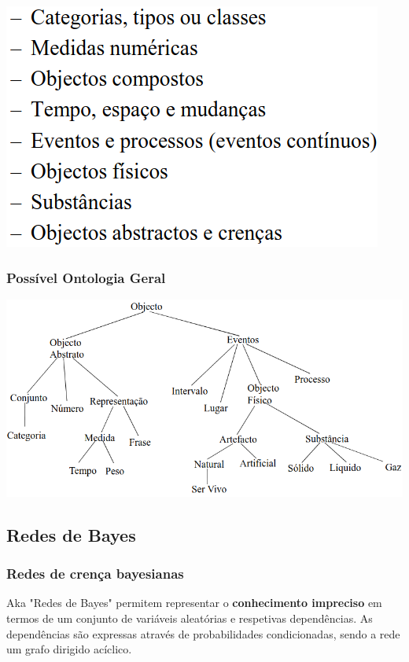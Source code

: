 \documentclass{article}
\begin{document}
\begin{center}
  \includegraphics[scale=0.35]{45}
\end{center}

\subsubsection*{Possível Ontologia Geral}

\begin{center}
  \includegraphics[scale=0.4]{46}
\end{center}

\pagebreak

\subsection{Redes de Bayes}

\subsubsection{Redes de crença bayesianas}

Aka "Redes de Bayes" permitem representar o \textbf{conhecimento impreciso}
em termos de um conjunto de variáveis aleatórias e respetivas
dependências. As dependências são expressas através de
probabilidades condicionadas, sendo a rede um grafo dirigido acíclico.
\end{document}
